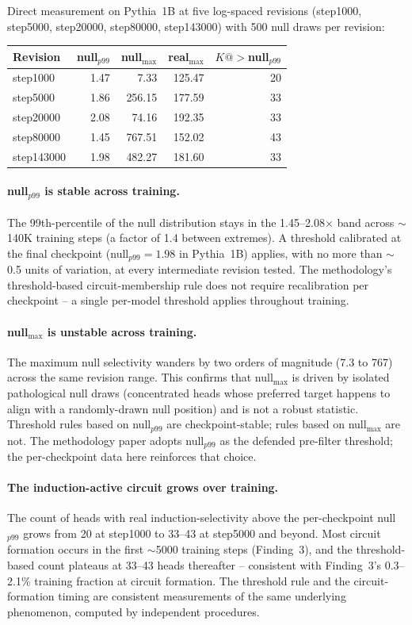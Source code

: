 \documentclass[11pt]{article}
\begin{document}
Direct measurement on Pythia~1B at five log-spaced revisions
(step1000, step5000, step20000, step80000, step143000) with 500
null draws per revision:

\begin{center}
\footnotesize
\begin{tabular}{lrrrr}
\toprule
Revision & null$_{p99}$ & null$_{\max}$ & real$_{\max}$ & $K@>$null$_{p99}$ \\
\midrule
step1000   & 1.47 & 7.33   & 125.47 & 20 \\
step5000   & 1.86 & 256.15 & 177.59 & 33 \\
step20000  & 2.08 & 74.16  & 192.35 & 33 \\
step80000  & 1.45 & 767.51 & 152.02 & 43 \\
step143000 & 1.98 & 482.27 & 181.60 & 33 \\
\bottomrule
\end{tabular}
\end{center}

\paragraph{null$_{p99}$ is stable across training.} The 99th-percentile
of the null distribution stays in the 1.45--2.08$\times$ band across
$\sim$140K training steps (a factor of 1.4 between extremes). A
threshold calibrated at the final checkpoint (null$_{p99} = 1.98$ in
Pythia~1B) applies, with no more than $\sim$0.5 units of variation, at
every intermediate revision tested. The methodology's threshold-based
circuit-membership rule does not require recalibration per checkpoint --
a single per-model threshold applies throughout training.

\paragraph{null$_{\max}$ is unstable across training.} The maximum null
selectivity wanders by two orders of magnitude (7.3 to 767) across the
same revision range. This confirms that null$_{\max}$ is driven by
isolated pathological null draws (concentrated heads whose preferred
target happens to align with a randomly-drawn null position) and is not
a robust statistic. Threshold rules based on null$_{p99}$ are
checkpoint-stable; rules based on null$_{\max}$ are not. The
methodology paper adopts null$_{p99}$ as the defended pre-filter
threshold; the per-checkpoint data here reinforces that choice.

\paragraph{The induction-active circuit grows over training.} The
count of heads with real induction-selectivity above the per-checkpoint
null$_{p99}$ grows from 20 at step1000 to 33--43 at step5000 and beyond.
Most circuit formation occurs in the first $\sim$5000 training steps
(Finding~3), and the threshold-based count plateaus at 33--43 heads
thereafter -- consistent with Finding~3's 0.3--2.1\% training fraction
at circuit formation. The threshold rule and the circuit-formation
timing are consistent measurements of the same underlying phenomenon,
computed by independent procedures.
\end{document}
